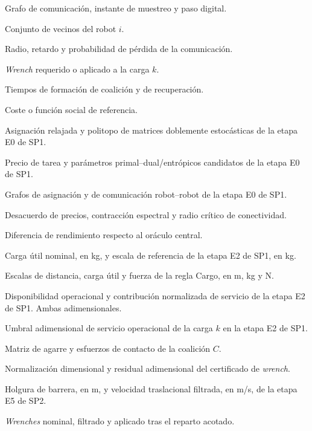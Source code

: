 \begin{description}[style=multiline,leftmargin=8.2em,labelwidth=7.2em,itemsep=0.15em,parsep=0pt]
  \item[$G(t),t_m,\Delta t$] Grafo de comunicación, instante de muestreo y paso digital.
  \item[$\mathcal N_i(t)$] Conjunto de vecinos del robot $i$.
  \item[$R,\tau_d,p_{\mathrm{loss}}$] Radio, retardo y probabilidad de pérdida de la comunicación.
  \item[$W_k$] \emph{Wrench} requerido o aplicado a la carga $k$.
  \item[$T_{\mathrm{coal}},T_{\mathrm{rec}}$] Tiempos de formación de coalición y de recuperación.
  \item[$J$] Coste o función social de referencia.
  \item[$X,\mathcal B_N$] Asignación relajada y politopo de matrices doblemente estocásticas de la etapa E0 de SP1.
  \item[$\pi_k,\rho,\gamma,\tau$] Precio de tarea y parámetros primal--dual/entrópicos candidatos de la etapa E0 de SP1.
  \item[$\mathcal G_A,\mathcal G_C$] Grafos de asignación y de comunicación robot--robot de la etapa E0 de SP1.
  \item[$e_\pi^t,q,R^\star$] Desacuerdo de precios, contracción espectral y radio crítico de conectividad.
  \item[Brecha] Diferencia de rendimiento respecto al oráculo central.
  \item[$c_i^{\mathrm{pay}},c^{\mathrm{ref}}$] Carga útil nominal, en kg, y escala de referencia de la etapa E2 de SP1, en kg.
  \item[$\delta_C^{\mathrm{ref}},c_C^{\mathrm{ref}},f_C^{\mathrm{ref}}$] Escalas de distancia, carga útil y fuerza de la regla Cargo, en m, kg y N.
  \item[$a_{ik},e_{ik}$] Disponibilidad operacional y contribución normalizada de servicio de la etapa E2 de SP1. Ambas adimensionales.
  \item[$d_k^{\mathrm{srv}}$] Umbral adimensional de servicio operacional de la carga $k$ en la etapa E2 de SP1.
  \item[$G_C(q),\boldsymbol\lambda_C$] Matriz de agarre y esfuerzos de contacto de la coalición $C$.
  \item[$Q_W,\rho_k^W$] Normalización dimensional y residual adimensional del certificado de \emph{wrench}.
  \item[$h_j,v_k^{\mathrm{fil}}$] Holgura de barrera, en m, y velocidad traslacional filtrada, en m/s, de la etapa E5 de SP2.
  \item[$\scriptstyle W_k^{\mathrm{nom}},W_k^{\mathrm{fil}},W_k^{\mathrm{apl}}$] \emph{Wrenches} nominal, filtrado y aplicado tras el reparto acotado.

\end{description}
